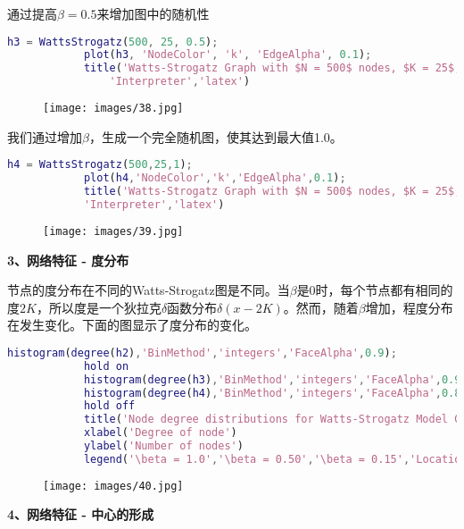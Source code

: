             \par
            通过提高$\beta = 0.5$来增加图中的随机性
            \begin{lstlisting}[language=Matlab]
            h3 = WattsStrogatz(500, 25, 0.5);
            plot(h3, 'NodeColor', 'k', 'EdgeAlpha', 0.1);
            title('Watts-Strogatz Graph with $N = 500$ nodes, $K = 25$, and $\beta = 0.50$', ...
                'Interpreter','latex')
             \end{lstlisting}
            \begin{figure}[H]
            \centering
            \texttt{[image: images/38.jpg]}
            \end{figure}
            我们通过增加$\beta$，生成一个完全随机图，使其达到最大值1.0。
            \begin{lstlisting}[language=Matlab]
            h4 = WattsStrogatz(500,25,1);
            plot(h4,'NodeColor','k','EdgeAlpha',0.1);
            title('Watts-Strogatz Graph with $N = 500$ nodes, $K = 25$, and $\beta = 1$', ...
            'Interpreter','latex')
             \end{lstlisting}
            \begin{figure}[H]
            \centering
            \texttt{[image: images/39.jpg]}
            \end{figure}
            \textbf{3、网络特征 - 度分布}
            \par
            节点的度分布在不同的Watts-Strogatz图是不同。当$\beta$是0时，每个节点都有相同的度$2K$，所以度是一个狄拉克$\delta$函数分布$\delta(x-2K)$。然而，随着$\beta$增加，程度分布在发生变化。下面的图显示了度分布的变化。
            \begin{lstlisting}[language=Matlab]
            histogram(degree(h2),'BinMethod','integers','FaceAlpha',0.9);
            hold on
            histogram(degree(h3),'BinMethod','integers','FaceAlpha',0.9);
            histogram(degree(h4),'BinMethod','integers','FaceAlpha',0.8);
            hold off
            title('Node degree distributions for Watts-Strogatz Model Graphs')
            xlabel('Degree of node')
            ylabel('Number of nodes')
            legend('\beta = 1.0','\beta = 0.50','\beta = 0.15','Location','NorthWest')
             \end{lstlisting}
            \begin{figure}[H]
            \centering
            \texttt{[image: images/40.jpg]}
            \end{figure}
            \textbf{4、网络特征 - 中心的形成}
